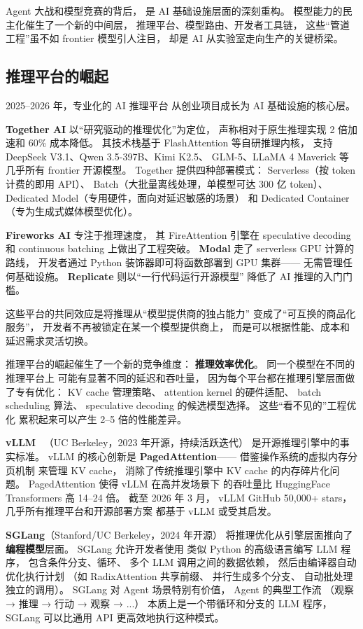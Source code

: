 Agent 大战和模型竞赛的背后，
是 AI 基础设施层面的深刻重构。
模型能力的民主化催生了一个新的中间层，
推理平台、模型路由、开发者工具链，
这些“管道工程”虽不如 frontier 模型引人注目，
却是 AI 从实验室走向生产的关键桥梁。

\subsection{推理平台的崛起}

2025--2026 年，专业化的 AI 推理平台
从创业项目成长为 AI 基础设施的核心层。

\textbf{Together AI} 以“研究驱动的推理优化”为定位，
声称相对于原生推理实现 2 倍加速和 60\% 成本降低。
其技术栈基于 FlashAttention 等自研推理内核，
支持 DeepSeek V3.1、Qwen 3.5-397B、Kimi K2.5、
GLM-5、LLaMA 4 Maverick 等几乎所有 frontier 开源模型。
Together 提供四种部署模式：
Serverless（按 token 计费的即用 API）、
Batch（大批量离线处理，单模型可达 300 亿 token）、
Dedicated Model（专用硬件，面向对延迟敏感的场景）
和 Dedicated Container（专为生成式媒体模型优化）。

\textbf{Fireworks AI} 专注于推理速度，
其 FireAttention 引擎在 speculative decoding
和 continuous batching 上做出了工程突破。
\textbf{Modal} 走了 serverless GPU 计算的路线，
开发者通过 Python 装饰器即可将函数部署到 GPU 集群——
无需管理任何基础设施。
\textbf{Replicate} 则以“一行代码运行开源模型”
降低了 AI 推理的入门门槛。

这些平台的共同效应是将推理从“模型提供商的独占能力”
变成了“可互换的商品化服务”，
开发者不再被锁定在某一个模型提供商上，
而是可以根据性能、成本和延迟需求灵活切换。

推理平台的崛起催生了一个新的竞争维度：
\textbf{推理效率优化}。
同一个模型在不同的推理平台上
可能有显著不同的延迟和吞吐量，
因为每个平台都在推理引擎层面做了专有优化：
KV cache 管理策略、
attention kernel 的硬件适配、
batch scheduling 算法、
speculative decoding 的候选模型选择。
这些“看不见的”工程优化
累积起来可以产生 2--5 倍的性能差异。

\textbf{vLLM}~\cite{kwon2023vllm}
（UC Berkeley，2023 年开源，持续活跃迭代）
是开源推理引擎中的事实标准。
vLLM 的核心创新是
\textbf{PagedAttention}——
借鉴操作系统的虚拟内存分页机制
来管理 KV cache，
消除了传统推理引擎中
KV cache 的内存碎片化问题。
PagedAttention 使得 vLLM 在高并发场景下
的吞吐量比 HuggingFace Transformers 高 14--24 倍。
截至 2026 年 3 月，
vLLM GitHub 50,000+ stars，
几乎所有推理平台和开源部署方案
都基于 vLLM 或受其启发。

\textbf{SGLang}（Stanford/UC Berkeley，2024 年开源）
将推理优化从引擎层面推向了\textbf{编程模型}层面。
SGLang 允许开发者使用
类似 Python 的高级语言编写 LLM 程序，
包含条件分支、循环、
多个 LLM 调用之间的数据依赖，
然后由编译器自动优化执行计划
（如 RadixAttention 共享前缀、
并行生成多个分支、
自动批处理独立的调用）。
SGLang 对 Agent 场景特别有价值，
Agent 的典型工作流
（观察 → 推理 → 行动 → 观察 → ...）
本质上是一个带循环和分支的 LLM 程序，
SGLang 可以比通用 API 更高效地执行这种模式。

